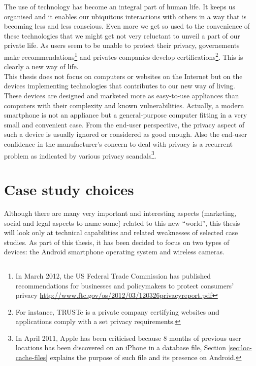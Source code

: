 The use of technology has become an integral part of human life.
It keeps us organised and it enables our ubiquitous interactions with others in a way that is becoming less and less conscious.
Even more we get so used to the convenience of these technologies that we might get not very reluctant to unveil a part of our private life.
As users seem to be unable to protect their privacy, governements make recommendations\footnote{In March 2012, the US Federal Trade Commission has published recommendations for businesses and policymakers to protect consumers' privacy \url{http://www.ftc.gov/os/2012/03/120326privacyreport.pdf}} and privates companies develop certifications\footnote{For instance, TRUSTe is a private company certifying websites and applications comply with a set privacy requirements.}.
This is clearly a new way of life.\\

This thesis does not focus on computers or websites on the Internet but on the devices implementing technologies that contributes to our new way of living.
These devices are designed and marketed more as easy-to-use appliances than computers with their complexity and known vulnerabilities.
Actually, a modern smartphone is not an appliance but a general-purpose computer fitting in a very small and convenient case.
From the end-user perspective, the privacy aspect of such a device is usually ignored or considered as good enough.
Also the end-user confidence in the manufacturer’s concern to deal with privacy is a recurrent problem as indicated by various privacy scandals\footnote{In April 2011, Apple has been criticised because 8 months of previous user locations has been discovered on an iPhone in a database file, Section \ref{sec:loc-cache-files} explains the purpose of such file and its presence on Android.}.\\

\section*{Case study choices}

Although there are many very important and interesting aspects (marketing, social and legal aspects to name some) related to this new ``world'', this thesis will look only at technical capabilities and related weaknesses of selected case studies.
As part of this thesis, it has been decided to focus on two types of devices: the Android smartphone operating system and wireless cameras.\\

